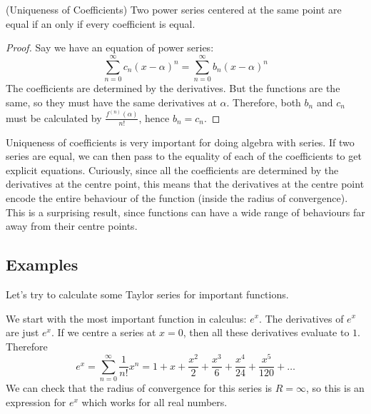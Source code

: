 \documentclass[fleqn]{report}
\begin{document}
\begin{prop}
(Uniqueness of Coefficients) Two power series centered at the
same point are equal if an only if every coefficient is
equal.
\end{prop}

\begin{proof}
Say we have an equation of power series:
\begin{equation*}
\sum_{n=0}^\infty c_n (x-\alpha)^n = 
\sum_{n=0}^\infty b_n (x-\alpha)^n
\end{equation*}
The coefficients are determined by the derivatives. But 
the functions are the same, so they must have the same
derivatives at $\alpha$. Therefore, both $b_n$ and $c_n$ must
be calculated by $\frac{f^{(n)}(\alpha)}{n!}$, hence $b_n =
c_n$.
\end{proof}

Uniqueness of coefficients is very important for doing algebra
with series. If two series are equal, we can then pass to the
equality of each of the coefficients to get explicit
equations. Curiously, since all the coefficients are
determined by the derivatives at the centre point, this means
that the derivatives at the centre point encode the entire
behaviour of the function (inside the radius of convergence).
This is a surprising result, since functions can have a wide
range of behaviours far away from their centre points. 

\subsection{Examples}
\label{taylor-series-examples}

Let's try to calculate some Taylor series for important
functions. 

\begin{example}
We start with the most important function in
calculus: $e^x$. The derivatives of $e^x$ are just $e^x$. If
we centre a series at $x=0$, then all these derivatives
evaluate to $1$. Therefore
\begin{equation*}
e^x = \sum_{n=0}^\infty \frac{1}{n!}x^n = 1 + x + \frac{x^2}{2} +
\frac{x^3}{6} + \frac{x^4}{24} + \frac{x^5}{120} + \ldots
\end{equation*}
We can check that the radius of convergence for this series is
$R = \infty$, so this is an expression for $e^x$ which works
for all real numbers. 
\end{example}
\end{document}
